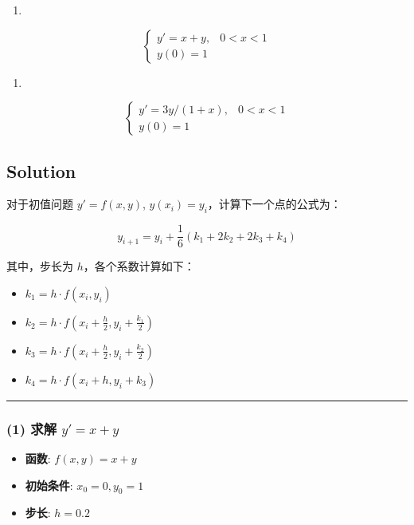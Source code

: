 \documentclass[11pt]{article}
\providecommand{\tightlist}{%
      \setlength{\itemsep}{0pt}\setlength{\parskip}{0pt}}
\begin{document}
\begin{enumerate}
\def\labelenumi{(\arabic{enumi})}
\tightlist
\item
\end{enumerate}

\[
\begin{cases}
y' = x + y, & 0 < x < 1\\
y(0) = 1
\end{cases}
\]

\begin{enumerate}
\def\labelenumi{(\arabic{enumi})}
\setcounter{enumi}{1}
\tightlist
\item
\end{enumerate}

\[
\begin{cases}
y' = 3y/(1 + x), & 0 < x < 1 \\
y(0) = 1
\end{cases}
\]

\subsection{Solution}\label{solution}

对于初值问题 \(y' = f(x, y)\), \(y(x_i) = y_i\)，计算下一个点的公式为：

\[ y_{i+1} = y_i + \frac{1}{6}(k_1 + 2k_2 + 2k_3 + k_4) \]

其中，步长为 \(h\)，各个系数计算如下：

\begin{itemize}
\tightlist
\item
  \(k_1 = h \cdot f(x_i, y_i)\)
\item
  \(k_2 = h \cdot f(x_i + \frac{h}{2}, y_i + \frac{k_1}{2})\)
\item
  \(k_3 = h \cdot f(x_i + \frac{h}{2}, y_i + \frac{k_2}{2})\)
\item
  \(k_4 = h \cdot f(x_i + h, y_i + k_3)\)
\end{itemize}

\begin{center}\rule{0.5\linewidth}{0.5pt}\end{center}

\subsubsection{\texorpdfstring{(1) 求解
\(y' = x + y\)}{(1) 求解 y\textquotesingle{} = x + y}}\label{ux6c42ux89e3-y-x-y}

\begin{itemize}
\tightlist
\item
  \textbf{函数}: \(f(x, y) = x + y\)
\item
  \textbf{初始条件}: \(x_0 = 0, y_0 = 1\)
\item
  \textbf{步长}: \(h = 0.2\)
\end{itemize}
\end{document}
